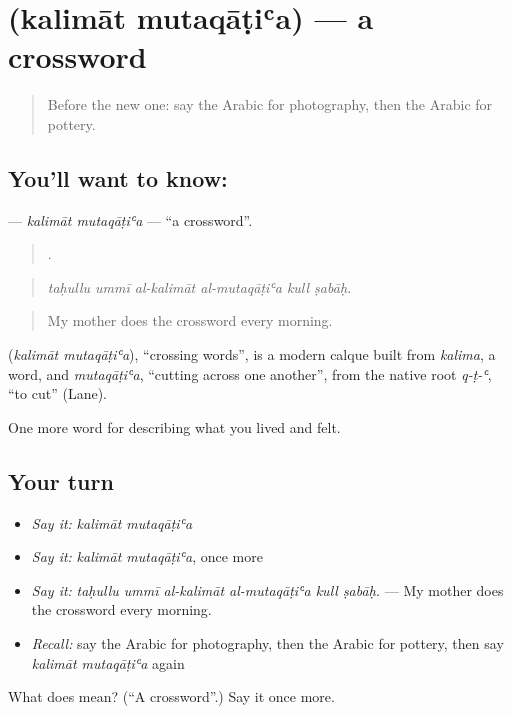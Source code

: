 \section[\texorpdfstring{\ar{كلمات} \ar{متقاطعة} (kalimāt mutaqāṭiʿa)}{كلمات متقاطعة (kalimāt mutaqāṭiʿa)}]{  (kalimāt mutaqāṭiʿa) — a crossword}

\label{lesson:AR-C537-kalimat-mutaqatia}



\begin{quote}
Before the new one: say the Arabic for photography, then the Arabic for pottery.
\end{quote}

\subsection*{You'll want to know:  }
\textbf{ } — \emph{kalimāt mutaqāṭiʿa} — \textquotedblleft{}a crossword\textquotedblright{}.

\begin{quote}
     .
\end{quote}

\begin{quote}
\emph{taḥullu ummī al-kalimāt al-mutaqāṭiʿa kull ṣabāḥ.}
\end{quote}

\begin{quote}
My mother does the crossword every morning.
\end{quote}

\begin{cousinweb}
\textbf{ } (\emph{kalimāt mutaqāṭiʿa}), \textquotedblleft{}crossing words\textquotedblright{}, is a modern calque built from \emph{kalima}, a word, and \emph{mutaqāṭiʿa}, \textquotedblleft{}cutting across one another\textquotedblright{}, from the native root \emph{q-ṭ-ʿ}, \textquotedblleft{}to cut\textquotedblright{} (Lane).
\end{cousinweb}

\begin{grammarlens}[title={What you've built}]
One more word for describing what you lived and felt.
\end{grammarlens}

\subsection*{Your turn}
\begin{itemize}
\raggedright
  \item \emph{Say it:} \emph{kalimāt mutaqāṭiʿa}
  \item \emph{Say it:} \emph{kalimāt mutaqāṭiʿa}, once more
  \item \emph{Say it:} \emph{taḥullu ummī al-kalimāt al-mutaqāṭiʿa kull ṣabāḥ.} — My mother does the crossword every morning.
  \item \emph{Recall:} say the Arabic for photography, then the Arabic for pottery, then say \emph{kalimāt mutaqāṭiʿa} again
\end{itemize}

\begin{tcolorbox}[breakable,colback=teal!4,colframe=teal!35!black,title={Before you move on}]
What does   mean? (\textquotedblleft{}A crossword\textquotedblright{}.) Say it once more.
\end{tcolorbox}
